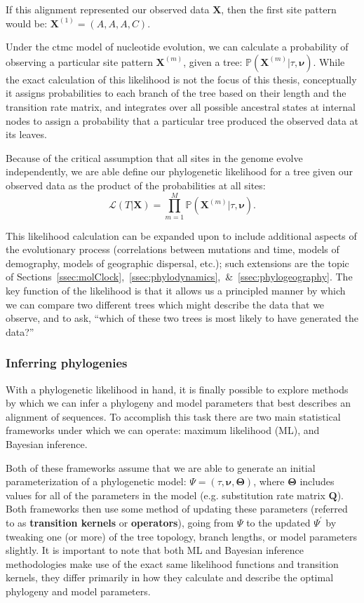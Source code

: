 If this alignment represented our observed data $\mathbf{X}$, then the first site pattern would be: $\mathbf{X}^(1) = (A, A, A, C)$.

Under the \gls{ctmc} model of nucleotide evolution, we can calculate a probability of observing a particular site pattern $\mathbf{X}^{(m)}$, given a tree: $\mathbb{P}(\mathbf{X}^{(m)} | \tau, \mathbf{\nu})$.
While the exact calculation of this likelihood is not the focus of this thesis, conceptually it assigns probabilities to each branch of the tree based on their length and the transition rate matrix, and integrates over all possible ancestral states at internal nodes to assign a probability that a particular tree produced the observed data at its leaves.

Because of the critical assumption that all sites in the genome evolve independently, we are able define our phylogenetic likelihood for a tree given our observed data as the product of the probabilities at all sites:
\begin{equation}\label{eq:likelihood}
  \mathcal{L}(T | \mathbf{X}) = \prod_{m=1}^M \mathbb{P}(\mathbf{X}^{(m)} | \tau, \mathbf{\nu}). 
\end{equation}

This likelihood calculation can be expanded upon to include additional aspects of the evolutionary process (correlations between mutations and time, models of demography, models of geographic dispersal, etc.); such extensions are the topic of Sections~\ref{ssec:molClock},~\ref{ssec:phylodynamics},~\&~\ref{ssec:phylogeography}.
The key function of the likelihood is that it allows us a principled manner by which we can compare two different trees which might describe the data that we observe, and to ask, ``which of these two trees is most likely to have generated the data?''

\subsubsection{Inferring phylogenies}
With a phylogenetic likelihood in hand, it is finally possible to explore methods by which we can infer a phylogeny and model parameters that best describes an alignment of sequences.
To accomplish this task there are two main statistical frameworks under which we can operate: maximum likelihood (ML), and Bayesian inference.

Both of these frameworks assume that we are able to generate an initial parameterization of a phylogenetic model: $\Psi = (\tau, \mathbf{\nu}, \mathbf{\Theta})$, where $\mathbf{\Theta}$ includes values for all of the parameters in the model (e.g. substitution rate matrix $\mathbf{Q}$).
Both frameworks then use some method of updating these parameters (referred to as \textbf{transition kernels} or \textbf{operators}), going from $\Psi$ to the updated $\Psi^{\prime}$ by tweaking one (or more) of the tree topology, branch lengths, or model parameters slightly.
It is important to note that both ML and Bayesian inference methodologies make use of the exact same likelihood functions and transition kernels, they differ primarily in how they calculate and describe the optimal phylogeny and model parameters.

